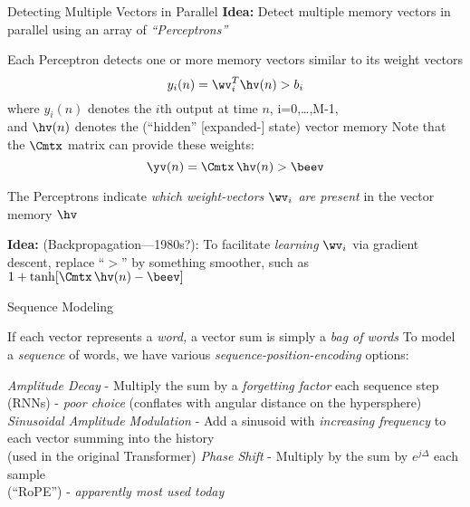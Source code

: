 \begin{slide}[\slideopts,toc={Perceptrons}]{Detecting Multiple Vectors in Parallel}
\maybepause
\vspace{1em}
\textbf{Idea:} Detect multiple memory vectors in parallel using an array of \emph{``Perceptrons''}
\begin{itemize}
  \mpitem Each Perceptron detects one or more memory vectors similar to its weight vectors
  \[
  y_i(n) = \wv_i^T\hv(n) > b_i
  \]
  where $y_i(n)$ denotes the $i$th output at time $n$, i=0,\ldots,M-1,\\
  and $\hv(n)$ denotes the (``hidden'' [expanded-] state) vector memory
  \mpitem Note that the $\Cmtx$ matrix can provide these weights:
  \[
  \yv(n) = \Cmtx\,\hv(n) > \beev
  \]

\mpitem The Perceptrons indicate \emph{which weight-vectors $\wv_i$ are present} in the vector memory $\hv$

\mpitem \textbf{Idea:} (Backpropagation---1980s?): To facilitate
\emph{learning} $\wv_i$ via gradient descent, replace ``$>$'' by
something smoother, such as $1+\tanh[\Cmtx\,\hv(n) - \beev]$

\end{itemize}

\end{slide}

\begin{slide}[\slideopts,toc={Sequences}]{Sequence Modeling}
  \vspace{-1em}
  \begin{itemize}
    \mpitem If each vector represents a \emph{word,} a vector sum is simply a \emph{bag of words}
    \mpitem To model a \emph{sequence} of words, we have various \emph{sequence-position-encoding} options:
    \begin{enumerate}
      \mpitem \emph{Amplitude Decay} - Multiply the sum by a \emph{forgetting factor} each sequence step\\
      (RNNs) - \emph{poor choice} (conflates with angular distance on the hypersphere)
      \mpitem \emph{Sinusoidal Amplitude Modulation} - Add a sinusoid with \emph{increasing frequency} to each vector summing into the history\\
      (used in the original Transformer)
      \mpitem \emph{Phase Shift} - Multiply by the sum by $e^{j\Delta}$ each sample\\
      (``RoPE'') - \emph{apparently most used today}
    \end{enumerate}
  \end{itemize}
\end{slide}


